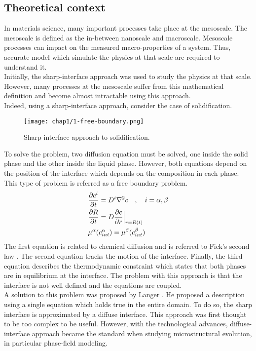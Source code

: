 \subsection{Theoretical context}
    In materials science, many important processes take place at the mesoscale. The mesoscale is defined as the in-between nanoscale and macroscale. Mesoscale processes can impact on the measured macro-properties of a system. Thus, accurate model which simulate the physics at that scale are required to understand it.\\
    Initially, the sharp-interface approach was used to study the physics at that scale. However, many processes at the mesoscale suffer from this mathematical definition and become almost intractable using this approach.\\
    Indeed, using a sharp-interface approach, consider the case of solidification.
    \begin{figure}[H]
        \centering
        \texttt{[image: chap1/1-free-boundary.png]}
        \caption{Sharp interface approach to solidification.}
        \label{fig:1-sharp-interface}
    \end{figure}
    To solve the problem, two diffusion equation must be solved, one inside the solid phase and the other inside the liquid phase. However, both equations depend on the position of the interface which depends on the composition in each phase. This type of problem is referred as a free boundary problem.
    \begin{equation}
        \begin{aligned}
            &\frac{\partial c^i}{\partial t} = D^i \nabla^2 c\quad,\quad i=\alpha, \beta\\
            &\frac{\partial R}{\partial t} = D \frac{\partial c}{\partial r}\Bigl|_{r=R(t)}\\
            &\mu^\alpha(c^\alpha_{int}) = \mu^\beta(c^\beta_{int})
        \end{aligned}
    \end{equation}
    The first equation is related to chemical diffusion and is referred to Fick's second law \cite{Gottstein2004}. The second equation tracks the motion of the interface. Finally, the third equation describes the thermodynamic constraint which states that both phases are in equilibrium at the interface. The problem with this approach is that the interface is not well defined and the equations are coupled.\\
    A solution to this problem was proposed by Langer \cite{Langer}. He proposed a description using a single equation which holds true in the entire domain. To do so, the sharp interface is approximated by a diffuse interface. This approach was first thought to be too complex to be useful. However, with the technological advances, diffuse-interface approach became the standard when studying microstructural evolution, in particular phase-field modeling.
